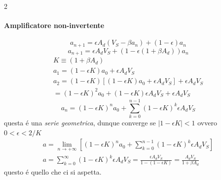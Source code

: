 \begin{multicols}{2}
  \paragraph{Amplificatore non-invertente}
  \begin{equation*}
    a_{n+1} = \epsilon A_d(V_S - \beta a_n) + (1 - \epsilon)a_n
  \end{equation*}
  \begin{equation*}
    a_{n+1} = \epsilon A_dV_S + (1 - \epsilon(1 + \beta A_d))a_n
  \end{equation*}
  \begin{equation*}
    \begin{gathered}
      K \equiv (1 + \beta A_d) \\
      a_1 = (1 -\epsilon K)a_0 + \epsilon A_d V_S \\
      a_2 = (1 - \epsilon K)\left[(1 - \epsilon K)a_0 + \epsilon A_d V_S\right] + \epsilon A_d V_S \\=
      (1 - \epsilon K)^2a_0 + (1 - \epsilon K)\epsilon A_d V_S + \epsilon A_d V_S
    \end{gathered}
  \end{equation*}
  \begin{equation*}
    a_n = (1 - \epsilon K)^na_0 + \sum_{k=0}^{n-1}(1 - \epsilon K)^k\epsilon A_dV_S
  \end{equation*}
  questa \'e una \textit{serie geometrica}, dunque converge se $|1 - \epsilon K| < 1$ ovvero
  $0 < \epsilon < 2/K$
  \begin{equation*}
    \begin{gathered}
      a = \lim_{n\to +\infty} \left[(1 - \epsilon K)^na_0 + \sum_{k=0}^{n-1}(1 - \epsilon K)^k\epsilon A_dV_S\right] \\
      a = \sum_{k=0}^{\infty}(1 - \epsilon K)^k\epsilon A_dV_S = \frac{\epsilon A_d V_S}{1 - (1 - \epsilon K)} = \frac{A_d V_S}{1 + \beta A_d}
    \end{gathered}
  \end{equation*}
  questo \'e quello che ci si aspetta.


\end{multicols}
